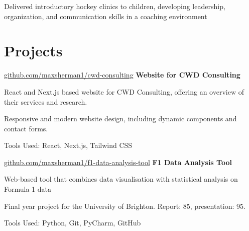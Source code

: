 	\vspace{0.10 cm}
	\begin{onecolentry}
		\begin{highlights}
			\item Delivered introductory hockey clinics to children, developing leadership, organization, and communication skills in a coaching environment
		\end{highlights}
	\end{onecolentry}
	
	\section{Projects}
	
	\begin{splitcolentry}{
			\href{https://github.com/maxsherman1/cwd-consulting}{github.com/maxsherman1/cwd-consulting}
		}
		\textbf{Website for CWD Consulting}
	\end{splitcolentry}
	
	\vspace{0.10 cm}
	\begin{onecolentry}
		\begin{highlights}
			\item React and Next.js based website for CWD Consulting, offering an overview of their services and research. 
			\item Responsive and modern website design, including dynamic components and contact forms.	
			\item Tools Used: React, Next.js, Tailwind CSS		\end{highlights}
	\end{onecolentry}
	
	\vspace{0.2 cm}	
	
	\begin{splitcolentry}{
			\href{https://github.com/maxsherman1/f1-data-analysis-tool}{github.com/maxsherman1/f1-data-analysis-tool}
		}
		\textbf{F1 Data Analysis Tool}
	\end{splitcolentry}
	
	\vspace{0.10 cm}
	\begin{onecolentry}
		\begin{highlights}
			\item Web-based tool that combines data visualisation with statistical analysis on Formula 1 data
			\item Final year project for the University of Brighton. Report: 85, presentation: 95.
			\item Tools Used: Python, Git, PyCharm, GitHub
		\end{highlights}
	\end{onecolentry}
	

